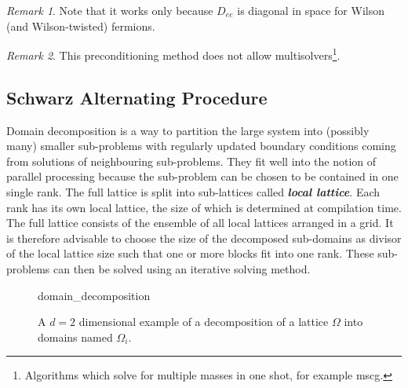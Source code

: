 \documentclass{article}
\theoremstyle{plain} %
\theoremstyle{convention} %
\theoremstyle{remark} %
\newtheorem*{remark}{Remark} %
\def\df#1{\textbf{\textit{#1}}}
\numberwithin{equation}{section}
\begin{document}
\begin{remark}
Note that it works only because $D_{ee}$ is diagonal in space for Wilson (and Wilson-twisted) fermions.
\end{remark}

\begin{remark}
This preconditioning method does not allow multisolvers\footnote{Algorithms which solve for multiple masses in one shot, for example \acrshort{mscg}.}.
\end{remark}

\subsection{Schwarz Alternating Procedure}

\label{sec:ddecomp}

Domain decomposition is a way to partition the large system into (possibly many) smaller sub-problems with regularly updated boundary conditions coming from solutions of neighbouring sub-problems. They fit well into the notion of parallel processing because the sub-problem can be chosen to be contained in one single rank. The full lattice is split into sub-lattices called \df{local lattice}. Each rank has its own local lattice, the size of which is determined at compilation time. The full lattice consists of the ensemble of all local lattices arranged in a grid. It is therefore advisable to choose the size of the decomposed sub-domains as divisor of the local lattice size such that one or more blocks fit into one rank. These sub-problems can then be solved using an iterative solving method.

\begin{figure}[h]
  \centering
  {domain_decomposition}
  \caption{A $d=2$ dimensional example of a decomposition of a lattice $\Omega$ into domains named $\Omega_i$.}
  \label{fig:ddecomp}
\end{figure}
\end{document}
